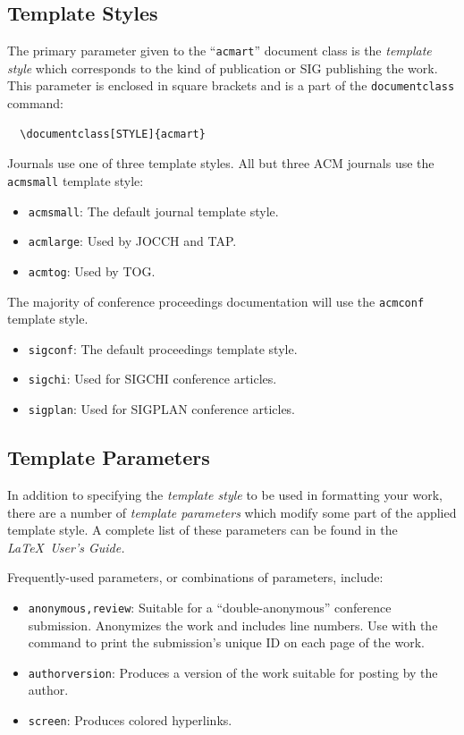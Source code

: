 \documentclass[sigconf, review]{acmart}
\begin{document}
\subsection{Template Styles}

The primary parameter given to the ``\verb|acmart|'' document class is
the {\itshape template style} which corresponds to the kind of publication
or SIG publishing the work. This parameter is enclosed in square
brackets and is a part of the {\verb|documentclass|} command:
\begin{verbatim}
  \documentclass[STYLE]{acmart}
\end{verbatim}

Journals use one of three template styles. All but three ACM journals
use the {\verb|acmsmall|} template style:
\begin{itemize}
\item {\texttt{acmsmall}}: The default journal template style.
\item {\texttt{acmlarge}}: Used by JOCCH and TAP.
\item {\texttt{acmtog}}: Used by TOG.
\end{itemize}

The majority of conference proceedings documentation will use the {\verb|acmconf|} template style.
\begin{itemize}
\item {\texttt{sigconf}}: The default proceedings template style.
\item{\texttt{sigchi}}: Used for SIGCHI conference articles.
\item{\texttt{sigplan}}: Used for SIGPLAN conference articles.
\end{itemize}

\subsection{Template Parameters}

In addition to specifying the {\itshape template style} to be used in
formatting your work, there are a number of {\itshape template parameters}
which modify some part of the applied template style. A complete list
of these parameters can be found in the {\itshape \LaTeX\ User's Guide.}

Frequently-used parameters, or combinations of parameters, include:
\begin{itemize}
\item {\texttt{anonymous,review}}: Suitable for a ``double-anonymous''
  conference submission. Anonymizes the work and includes line
  numbers. Use with the \texttt{\string\acmSubmissionID} command to print the
  submission's unique ID on each page of the work.
\item{\texttt{authorversion}}: Produces a version of the work suitable
  for posting by the author.
\item{\texttt{screen}}: Produces colored hyperlinks.
\end{itemize}
\end{document}
